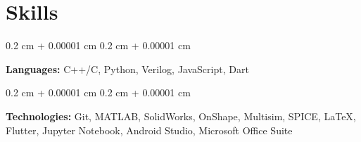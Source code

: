 \documentclass[10pt, letterpaper]{article}
\newenvironment{onecolentry}{
    \begin{adjustwidth}{
        0.2 cm + 0.00001 cm
    }{
        0.2 cm + 0.00001 cm
    }
}{
    \end{adjustwidth}
} %
\begin{document}
    
    \section{Skills}



        
        \begin{onecolentry}
            \textbf{Languages:} C++/C, Python, Verilog, JavaScript, Dart
        \end{onecolentry}

        \vspace{0.2 cm}

        \begin{onecolentry}
            \textbf{Technologies:} Git, MATLAB, SolidWorks, OnShape, Multisim, SPICE, \LaTeX, Flutter, Jupyter Notebook, Android Studio, Microsoft Office Suite
        \end{onecolentry}


    
\end{document}
